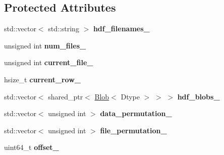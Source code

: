 \subsection*{Protected Attributes}
\begin{DoxyCompactItemize}
\item 
std\+::vector$<$ std\+::string $>$ {\bfseries hdf\+\_\+filenames\+\_\+}\hypertarget{classcaffe_1_1HDF5DataLayer_ae255f1e97fc8140bfeb7e3325f431f5a}{}\label{classcaffe_1_1HDF5DataLayer_ae255f1e97fc8140bfeb7e3325f431f5a}

\item 
unsigned int {\bfseries num\+\_\+files\+\_\+}\hypertarget{classcaffe_1_1HDF5DataLayer_aa6154c78cd3f375f1bba8dc544362e59}{}\label{classcaffe_1_1HDF5DataLayer_aa6154c78cd3f375f1bba8dc544362e59}

\item 
unsigned int {\bfseries current\+\_\+file\+\_\+}\hypertarget{classcaffe_1_1HDF5DataLayer_aa13b2e2012927eb433d007eb0cfcf8a7}{}\label{classcaffe_1_1HDF5DataLayer_aa13b2e2012927eb433d007eb0cfcf8a7}

\item 
hsize\+\_\+t {\bfseries current\+\_\+row\+\_\+}\hypertarget{classcaffe_1_1HDF5DataLayer_a375f447a432bcd2ba94859b5b270ac96}{}\label{classcaffe_1_1HDF5DataLayer_a375f447a432bcd2ba94859b5b270ac96}

\item 
std\+::vector$<$ shared\+\_\+ptr$<$ \hyperlink{classcaffe_1_1Blob}{Blob}$<$ Dtype $>$ $>$ $>$ {\bfseries hdf\+\_\+blobs\+\_\+}\hypertarget{classcaffe_1_1HDF5DataLayer_ac1978a2bb6dbcd7343bc13ee032328e3}{}\label{classcaffe_1_1HDF5DataLayer_ac1978a2bb6dbcd7343bc13ee032328e3}

\item 
std\+::vector$<$ unsigned int $>$ {\bfseries data\+\_\+permutation\+\_\+}\hypertarget{classcaffe_1_1HDF5DataLayer_a4b8ac8123356205c95dde2b7cd19835a}{}\label{classcaffe_1_1HDF5DataLayer_a4b8ac8123356205c95dde2b7cd19835a}

\item 
std\+::vector$<$ unsigned int $>$ {\bfseries file\+\_\+permutation\+\_\+}\hypertarget{classcaffe_1_1HDF5DataLayer_a9904d3326b0d687854b7aa62233d2f2f}{}\label{classcaffe_1_1HDF5DataLayer_a9904d3326b0d687854b7aa62233d2f2f}

\item 
uint64\+\_\+t {\bfseries offset\+\_\+}\hypertarget{classcaffe_1_1HDF5DataLayer_aa760969e3d444656b8dd4de2a2af1abe}{}\label{classcaffe_1_1HDF5DataLayer_aa760969e3d444656b8dd4de2a2af1abe}

\end{DoxyCompactItemize}


